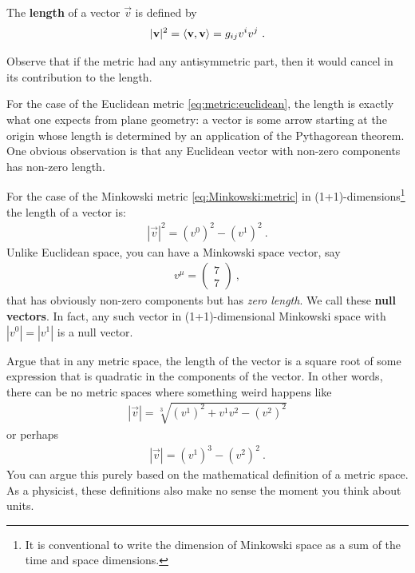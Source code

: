 \documentclass[12pt, oneside]{report}    %
\begin{document}
The \textbf{length} of a vector $\vec{v}$ is defined by
\begin{align}
 |\mathbf{v}|^2  
 = \langle \mathbf{v},\mathbf{v} \rangle 
 = g_{ij}v^iv^j
 \ .
 \label{eq:lenght:in:terms:of:metric}
\end{align}

\begin{exercise}
Observe that if the metric had any antisymmetric part, then it would cancel in its contribution to the length. 
\end{exercise}

\begin{example}
For the case of the Euclidean metric \eqref{eq:metric:euclidean}, the length is exactly what one expects from plane geometry: a vector is some arrow starting at the origin whose length is determined by an application of the Pythagorean theorem. One obvious observation is that any Euclidean vector with non-zero components has non-zero length.
\end{example}

\begin{example}
For the case of the Minkowski metric \eqref{eq:Minkowski:metric} in (1+1)-dimensions\footnote{It is conventional to write the dimension of Minkowski space as a sum of the time and space dimensions.} the length of a vector is:
\begin{align}
    |\vec{v}|^2 = (v^0)^2 - (v^1)^2 \ .
    \label{eq:minkowski:length:2d}
\end{align}
Unlike Euclidean space, you can have a Minkowski space vector, say 
\begin{align}
    v^\mu = 
    \begin{pmatrix}
        7\\
        7
    \end{pmatrix} \ ,
\end{align}
that has obviously non-zero components but has \emph{zero length}. We call these \textbf{null vectors}. In fact, any such vector in (1+1)-dimensional Minkowski space with $|v^0| = |v^1|$ is a null vector.
\end{example}

\begin{exercise}
Argue that in any metric space, the length of the vector is a square root of some expression that is quadratic in the components of the vector. In other words, there can be no metric spaces where something weird happens like
\begin{align}
    |\vec{v}| = \sqrt[3]{(v^1)^2 + v^1v^2 - (v^2)^2}
\end{align}
or perhaps
\begin{align}
    |\vec{v}| = (v^1)^3 - (v^2)^2 \ .
\end{align}
You can argue this purely based on the mathematical definition of a metric space. As a physicist, these definitions also make no sense the moment you think about units.
\end{exercise}
\end{document}
